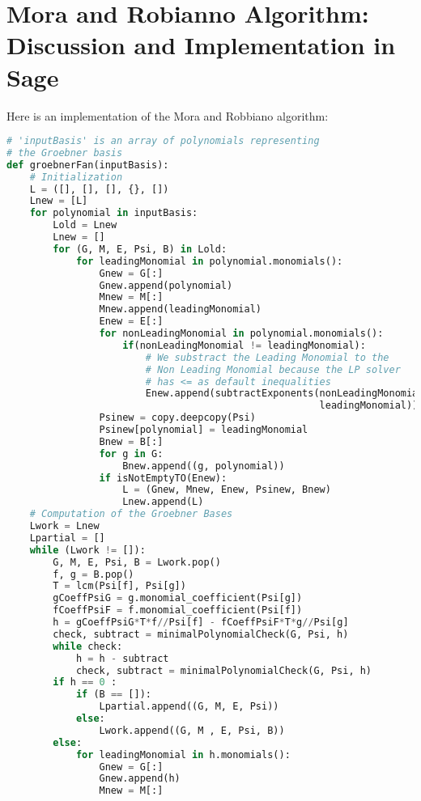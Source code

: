\section{Mora and Robianno Algorithm:
  Discussion and Implementation in Sage}

Here is an implementation of the Mora and Robbiano algorithm:

\begin{lstlisting}[language=Python]
# 'inputBasis' is an array of polynomials representing
# the Groebner basis
def groebnerFan(inputBasis):
    # Initialization
    L = ([], [], [], {}, [])
    Lnew = [L]
    for polynomial in inputBasis:
        Lold = Lnew
        Lnew = []
        for (G, M, E, Psi, B) in Lold:
            for leadingMonomial in polynomial.monomials():
                Gnew = G[:]
                Gnew.append(polynomial)
                Mnew = M[:]
                Mnew.append(leadingMonomial)
                Enew = E[:]
                for nonLeadingMonomial in polynomial.monomials():
                    if(nonLeadingMonomial != leadingMonomial):
                        # We substract the Leading Monomial to the
                        # Non Leading Monomial because the LP solver
                        # has <= as default inequalities
                        Enew.append(subtractExponents(nonLeadingMonomial,
                                                      leadingMonomial))
                Psinew = copy.deepcopy(Psi)
                Psinew[polynomial] = leadingMonomial
                Bnew = B[:]
                for g in G:
                    Bnew.append((g, polynomial))
                if isNotEmptyTO(Enew):
                    L = (Gnew, Mnew, Enew, Psinew, Bnew)
                    Lnew.append(L)
    # Computation of the Groebner Bases
    Lwork = Lnew
    Lpartial = []
    while (Lwork != []):
        G, M, E, Psi, B = Lwork.pop()
        f, g = B.pop()
        T = lcm(Psi[f], Psi[g])
        gCoeffPsiG = g.monomial_coefficient(Psi[g])
        fCoeffPsiF = f.monomial_coefficient(Psi[f])
        h = gCoeffPsiG*T*f//Psi[f] - fCoeffPsiF*T*g//Psi[g]
        check, subtract = minimalPolynomialCheck(G, Psi, h)
        while check:
            h = h - subtract
            check, subtract = minimalPolynomialCheck(G, Psi, h)
        if h == 0 :
            if (B == []):
                Lpartial.append((G, M, E, Psi))
            else:
                Lwork.append((G, M , E, Psi, B))
        else:
            for leadingMonomial in h.monomials():
                Gnew = G[:]
                Gnew.append(h)
                Mnew = M[:]

\end{lstlisting}
